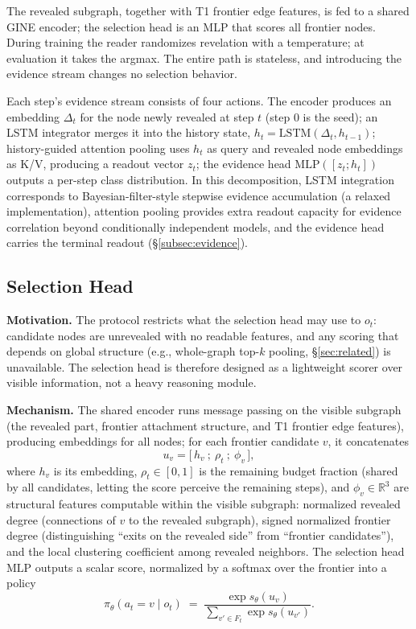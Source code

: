 \documentclass{article}
\begin{document}
The revealed subgraph, together with T1 frontier edge features, is fed to a shared GINE encoder; the selection head is an MLP that scores all frontier nodes. During training the reader randomizes revelation with a temperature; at evaluation it takes the argmax. The entire path is stateless, and introducing the evidence stream changes no selection behavior.

Each step's evidence stream consists of four actions. The encoder produces an embedding $\Delta_t$ for the node newly revealed at step $t$ (step 0 is the seed); an LSTM integrator merges it into the history state, $h_t=\mathrm{LSTM}(\Delta_t,h_{t-1})$; history-guided attention pooling uses $h_t$ as query and revealed node embeddings as K/V, producing a readout vector $z_t$; the evidence head $\mathrm{MLP}([z_t;h_t])$ outputs a per-step class distribution. In this decomposition, LSTM integration corresponds to Bayesian-filter-style stepwise evidence accumulation (a relaxed implementation), attention pooling provides extra readout capacity for evidence correlation beyond conditionally independent models, and the evidence head carries the terminal readout (\S\ref{subsec:evidence}).

\subsection{Selection Head}
\label{subsec:selector}

\textbf{Motivation.} The protocol restricts what the selection head may use to $o_t$: candidate nodes are unrevealed with no readable features, and any scoring that depends on global structure (e.g., whole-graph top-$k$ pooling, \S\ref{sec:related}) is unavailable. The selection head is therefore designed as a lightweight scorer over visible information, not a heavy reasoning module.

\textbf{Mechanism.} The shared encoder runs message passing on the visible subgraph (the revealed part, frontier attachment structure, and T1 frontier edge features), producing embeddings for all nodes; for each frontier candidate $v$, it concatenates
\[
u_v=\big[\,h_v\ ;\ \rho_t\ ;\ \phi_v\,\big],
\]
where $h_v$ is its embedding, $\rho_t\in[0,1]$ is the remaining budget fraction (shared by all candidates, letting the score perceive the remaining steps), and $\phi_v\in\mathbb R^3$ are structural features computable within the visible subgraph: normalized revealed degree (connections of $v$ to the revealed subgraph), signed normalized frontier degree (distinguishing ``exits on the revealed side'' from ``frontier candidates''), and the local clustering coefficient among revealed neighbors. The selection head $\mathrm{MLP}$ outputs a scalar score, normalized by a softmax over the frontier into a policy
\[
\pi_\theta(a_t{=}v\mid o_t)\;=\;\frac{\exp s_\theta(u_v)}{\sum_{v'\in F_t}\exp s_\theta(u_{v'})}.
\]
\end{document}
